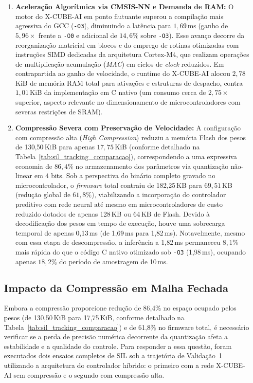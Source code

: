 \begin{enumerate}
    \item \textbf{Aceleração Algorítmica via CMSIS-NN e Demanda de RAM:} O motor do X-CUBE-AI em ponto flutuante superou a compilação mais agressiva do GCC (\texttt{-O3}), diminuindo a latência para ${1{,}69}$\,ms (ganho de $5{,}96\times$ frente a \texttt{-O0} e adicional de $14{,}6\%$ sobre \texttt{-O3}). Esse avanço decorre da reorganização matricial em blocos e do emprego de rotinas otimizadas com instruções SIMD dedicadas da arquitetura Cortex-M4, que realizam operações de multiplicação-acumulação (\textit{MAC}) em ciclos de \textit{clock} reduzidos. Em contrapartida ao ganho de velocidade, o runtime do X-CUBE-AI alocou $2{,}78$\,KiB de memória RAM total para ativações e estruturas de despacho, contra $1{,}01$\,KiB da implementação em C nativo (um consumo cerca de $2{,}75\times$ superior, aspecto relevante no dimensionamento de microcontroladores com severas restrições de SRAM).
    
    \item \textbf{Compressão Severa com Preservação de Velocidade:} A configuração com compressão alta (\textit{High Compression}) reduziu a memória Flash dos pesos de 130,50\,KiB para apenas ${17{,}75}$\,KiB (conforme detalhado na Tabela~\ref{tab:sil_tracking_comparacao}), correspondendo a uma expressiva economia de ${86{,}4\%}$ no armazenamento dos parâmetros via quantização não-linear em 4 bits. Sob a perspectiva do binário completo gravado no microcontrolador, o \textit{firmware} total contraiu de 182,25\,KB para ${69{,}51}$\,KB (redução global de ${61{,}8\%}$), viabilizando a incorporação do controlador preditivo com rede neural até mesmo em microcontroladores de custo reduzido dotados de apenas 128\,KB ou 64\,KB de Flash. Devido à decodificação dos pesos em tempo de execução, houve uma sobrecarga temporal de apenas 0,13\,ms (de 1,69\,ms para 1,82\,ms). Notavelmente, mesmo com essa etapa de descompressão, a inferência a 1,82\,ms permaneceu ${8{,}1\%}$ mais rápida do que o código C nativo otimizado sob \texttt{-O3} (1,98\,ms), ocupando apenas $18{,}2\%$ do período de amostragem de 10\,ms.
\end{enumerate}

\subsection{Impacto da Compressão em Malha Fechada}

Embora a compressão proporcione redução de 86,4\% no espaço ocupado pelos pesos (de 130,50\,KiB para 17,75\,KiB, conforme detalhado na Tabela~\ref{tab:sil_tracking_comparacao}) e de 61,8\% no firmware total, é necessário verificar se a perda de precisão numérica decorrente da quantização afeta a estabilidade e a qualidade do controle. Para responder a essa questão, foram executados dois ensaios completos de SIL sob a trajetória de Validação~1 utilizando a arquitetura do controlador híbrido: o primeiro com a rede X-CUBE-AI sem compressão e o segundo com compressão alta.

